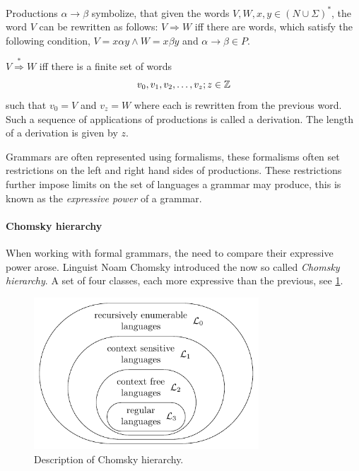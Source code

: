 Productions $\alpha \rightarrow \beta$ symbolize, that given the words $V,W,x,y \in \left( N \cup \Sigma \right)^{*}$, the word $V$ can be rewritten as follows:
$V \Rightarrow W$ iff there are words, which satisfy the following condition, $V=x\alpha y \wedge W=x\beta y$ and $\alpha \rightarrow \beta \in P$.

\begin{definition}[Derivation]
\label{def:derivation}
$V \stackrel{*}{\Rightarrow}  W$ iff there is a finite set of words 
$$ v_0, v_1, v_2, \dots, v_z;\medskip z \in \mathbb{Z}$$
such that $v_0 = V$ and $v_z = W$ where each is rewritten from the previous word. Such a sequence of applications of productions is called a derivation.
The length of a derivation is given by $z$. 
\end{definition}

Grammars are often represented using formalisms, these formalisms often set restrictions on the left and right hand sides of productions. These restrictions further impose limits on the set of languages a grammar may produce, this is known as the \emph{expressive power} of a grammar. 

\paragraph{Chomsky hierarchy}
When working with formal grammars, the need to compare their expressive power arose. Linguist Noam Chomsky introduced the now so called \emph{Chomsky hierarchy}\cite{chomsky1956three}. A set of four classes, each more expressive than the previous, see \cref{fig:chomsky-hierarchy}.



\begin{figure}[h]
  \caption{Description of Chomsky hierarchy.}
  \label{fig:chomsky-hierarchy}
  \centering
  \includegraphics[width=0.75\textwidth]{figures/chomsky-hierarchy.pdf}
\end{figure}

